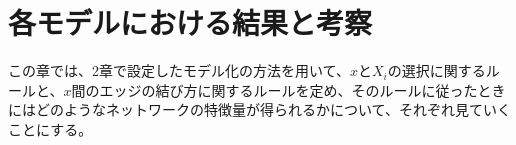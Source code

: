 \section{各モデルにおける結果と考察}

この章では、2章で設定したモデル化の方法を用いて、$x$と$X_{i}$の選択に関するルールと、$x$間のエッジの結び方に関するルールを定め、そのルールに従ったときにはどのようなネットワークの特徴量が得られるかについて、それぞれ見ていくことにする。







